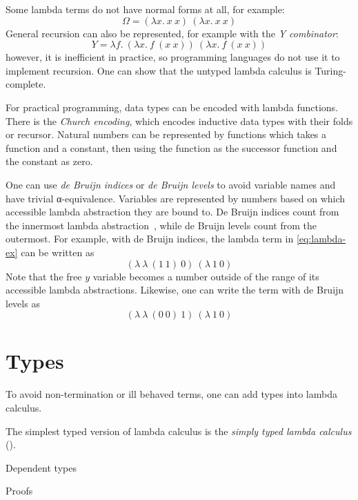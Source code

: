 Some lambda terms do not have normal forms at all, for example:
\begin{equation}
  \Omega = (\lambda x.\ x\ x)\ (\lambda x.\ x\ x)
  \label{eq:omega}
\end{equation}
General recursion can also be represented, for example with the \emph{Y
  combinator}:
\begin{equation}
  Y = \lambda f.\ (\lambda x.\ f\ (x\ x))\ (\lambda x.\ f\ (x\ x))
  \label{eq:ycomb}
\end{equation}
however, it is inefficient in practice, so programming languages do not use it
to implement recursion. One can show that the untyped lambda calculus is
Turing-complete.

For practical programming, data types can be encoded with lambda functions.
There is the \emph{Church encoding}, which encodes inductive data types with
their folds or recursor. Natural numbers can be represented by functions which
takes a function and a constant, then using the function as the successor
function and the constant as zero.

One can use \emph{de Bruijn indices} or \emph{de Bruijn levels} to avoid
variable names and have trivial α-equivalence. Variables are represented by
numbers based on which accessible lambda abstraction they are bound to. De
Bruijn indices count from the innermost lambda abstraction~\cite{debruijn},
while de Bruijn levels count from the outermost. For example, with de Bruijn
indices, the lambda term in \cref{eq:lambda-ex} can be written as
\begin{equation}
  (\lambda\ \lambda\ (1\ 1)\ 0)\ (\lambda\ 1\ 0)
  \label{eq:lambda-ex-index}
\end{equation}
Note that the free \(y\) variable becomes a number outside of the range of its
accessible lambda abstractions. Likewise, one can write the term with de Bruijn
levels as \begin{equation}
  (\lambda\ \lambda\ (0\ 0)\ 1)\ (\lambda\ 1\ 0)
  \label{eq:lambda-ex-level}
\end{equation}

\section{Types}\label{sec:types}

To avoid non-termination or ill behaved terms, one can add types into lambda
calculus.

The simplest typed version of lambda calculus is the \emph{simply typed lambda
  calculus} (\emph{}).

Dependent types

Proofs
